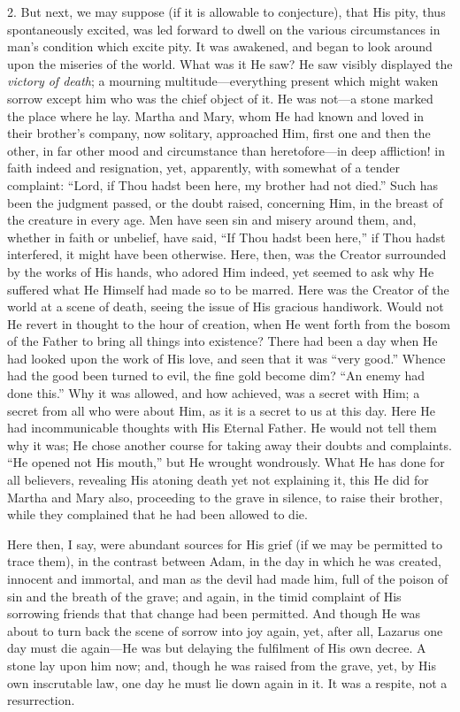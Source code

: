 2. But next, we may suppose (if it is allowable to conjecture),
that His pity, thus spontaneously excited, was led forward to dwell on
the various circumstances in man's condition which excite pity. It was
awakened, and began to look around upon the miseries of the world.
What was it He saw? He saw visibly displayed the \emph{victory of death};
a mourning multitude—everything present which might waken sorrow
except him who was the chief object of it. He was not—a stone marked
the place where he lay. Martha and Mary, whom He had known and loved
in their brother's company, now solitary, approached Him, first one
and then the other, in far other mood and circumstance than heretofore—in
deep affliction! in faith indeed and resignation, yet, apparently,
with somewhat of a tender complaint: ``Lord, if Thou hadst been
here, my brother had not died.'' Such has been the judgment
passed, or the doubt raised, concerning Him, in the breast of the
creature in every age. Men have seen sin and misery around them, and,
whether in faith or unbelief, have said, ``If Thou hadst been
here,'' if Thou hadst interfered, it might have been otherwise.
Here, then, was the Creator surrounded by the works of His hands, who
adored Him indeed, yet seemed to ask why He suffered what He Himself
had made so to be marred. Here was the Creator of the world at a scene
of death, seeing the issue of His gracious handiwork. Would not He
revert in thought to the hour of creation, when He went forth from the
bosom of the Father to bring all things into existence? There had been
a day when He had looked upon the work of His love, and seen that it
was ``very good.'' Whence had the good been turned to evil,
the fine gold become dim? ``An enemy had done this.'' Why it
was allowed, and how achieved, was a secret with Him; a secret from
all who were about Him, as it is a secret to us at this day. Here He
had incommunicable thoughts with His Eternal Father. He would not tell
them why it was; He chose another course for taking away their doubts
and complaints. ``He opened not His mouth,'' but He wrought
wondrously. What He has done for all believers, revealing His atoning
death yet not explaining it, this He did for Martha and Mary also,
proceeding to the grave in silence, to raise their brother, while they
complained that he had been allowed to die.

Here then, I say, were abundant sources for His grief (if we may be
permitted to trace them), in the contrast between Adam, in the day in
which he was created, innocent and immortal, and man as the devil had
made him, full of the poison of sin and the breath of the grave; and
again, in the timid complaint of His sorrowing friends that that
change had been permitted. And though He was about to turn back the
scene of sorrow into joy again, yet, after all, Lazarus one day must
die again—He was but delaying the fulfilment of His own decree. A
stone lay upon him now; and, though he was raised from the grave, yet,
by His own inscrutable law, one day he must lie down again in it. It
was a respite, not a resurrection.

